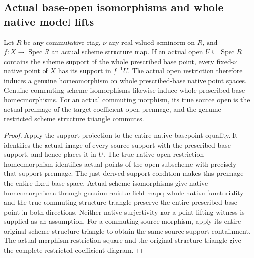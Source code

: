 \subsection{Actual base-open isomorphisms and whole native model lifts}
\label{subsec:native-base-open-modifications}

\begin{theorem}
\label{scheme:native-base-open-restriction}
\leanok
{}
Let $R$ be any commutative ring, $\nu$ any real-valued seminorm on $R$,
and $f:X\to\operatorname{Spec}R$ an actual scheme structure map.
If an actual open $U\subseteq\operatorname{Spec}R$ contains the scheme
support of the whole prescribed base point, every fixed-$\nu$ native
point of $X$ has its support in $f^{-1}U$. The actual open restriction
therefore induces a genuine homeomorphism on whole prescribed-base
native point spaces. Genuine commuting scheme isomorphisms likewise
induce whole prescribed-base homeomorphisms. For an actual commuting
morphism, its true source open is the actual preimage of the target
coefficient-open preimage, and the genuine restricted scheme structure
triangle commutes.
\end{theorem}
\begin{proof}
Apply the support projection to the entire native basepoint equality.
It identifies the actual image of every source support with the
prescribed base support, and hence places it in $U$. The true native
open-restriction homeomorphism identifies actual points of the open
subscheme with precisely that support preimage. The just-derived
support condition makes this preimage the entire fixed-base space.
Actual scheme isomorphisms give native homeomorphisms through genuine
residue-field maps; whole native functoriality and the true commuting
structure triangle preserve the entire prescribed base point in both
directions. Neither native surjectivity nor a point-lifting witness
is supplied as an assumption. For a commuting source morphism, apply
its entire original scheme structure triangle to obtain the same
source-support containment. The actual morphism-restriction square and
the original structure triangle give the complete restricted coefficient
diagram.
\end{proof}

